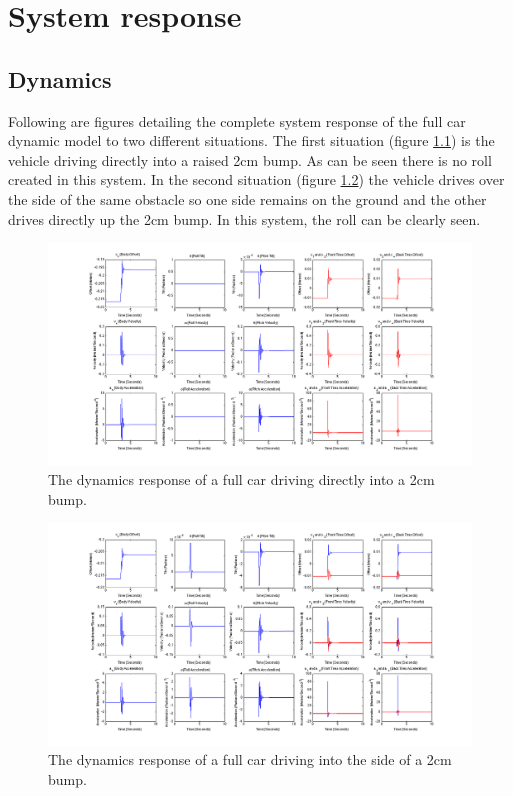 \chapter{System response}
\section{Dynamics}
\label{a:dynamics_response}
Following are figures detailing the complete system response of the full car dynamic model to two different situations. The first situation (figure \ref{fig:2cm_straight}) is the vehicle driving directly into a raised 2cm bump. As can be seen there is no roll created in this system. In the second situation (figure \ref{fig:2cm_ramp}) the vehicle drives over the side of the same obstacle so one side remains on the ground and the other drives directly up the 2cm bump. In this system, the roll can be clearly seen.

\begin{figure}[t]
	\centering
	\includegraphics[width=1\textwidth]{figures/fullcar_2cm_straight.png}
	\caption{The dynamics response of a full car driving directly into a 2cm bump.}
	\label{fig:2cm_straight}
\end{figure}

\begin{figure}[t]
	\centering
	\includegraphics[width=1\textwidth]{figures/fullcar_2cm_ramp.png}
	\caption{The dynamics response of a full car driving into the side of a 2cm bump.}
	\label{fig:2cm_ramp}
\end{figure}

